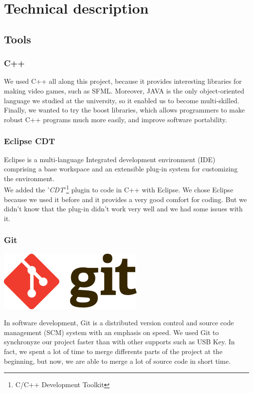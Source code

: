 \documentclass{scrreprt}
\begin{document}
		  \part{Technical description}
		  \chapter{Tools}
		  \section{C++}
		  We used C++ all along this project, because it provides interesting libraries for making video games, such as SFML.
		  Moreover, JAVA is the only object-oriented language we studied at the university, so it enabled us to become multi-skilled.
		  Finally, we wanted to try the boost libraries, which allows programmers to make robust C++ programs much more easily, and improve
		  software portability.
		  \section{Eclipse CDT}
		 Eclipse is a multi-language Integrated development environment (IDE) comprising a base workspace and an extensible plug-in system for customizing the environment.\\
		We added the '\emph{CDT}'\footnote{C/C++ Development Toolkit} plugin to code in C++ with Eclipse. We chose Eclipse because we used it before and it provides a very good comfort for coding. But we didn't know that the plug-in didn't work very well and we had some issues with it.
		  \section{Git}
		\begin {center}
		\includegraphics[scale=0.5]{Git.png}
		\end{center}
		In software development, Git is a distributed version control and source code management (SCM) system with an emphasis on speed.
		We used Git to synchronyze our project faster than with other supports such as USB Key. In fact, we spent a lot of time to merge differents parts of the project at the beginning, but now, we are able to merge a lot of source code in short time.\\
\end{document}
